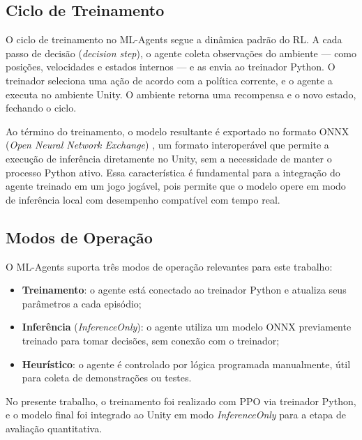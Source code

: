\subsection{Ciclo de Treinamento}
\label{subsec:ml-agents-ciclo}

O ciclo de treinamento no ML-Agents segue a dinâmica padrão do RL. A cada
passo de decisão (\textit{decision step}), o agente coleta observações do
ambiente --- como posições, velocidades e estados internos --- e as envia ao
treinador Python. O treinador seleciona uma ação de acordo com a política
corrente, e o agente a executa no ambiente Unity. O ambiente retorna uma
recompensa e o novo estado, fechando o ciclo.

Ao término do treinamento, o modelo resultante é exportado no formato ONNX
(\textit{Open Neural Network Exchange}) \cite{onnx2019}, um formato
interoperável que permite a execução de inferência diretamente no Unity, sem
a necessidade de manter o processo Python ativo. Essa característica é
fundamental para a integração do agente treinado em um jogo jogável, pois
permite que o modelo opere em modo de inferência local com desempenho
compatível com tempo real.

\subsection{Modos de Operação}
\label{subsec:ml-agents-modos}

O ML-Agents suporta três modos de operação relevantes para este trabalho:

\begin{itemize}
    \item \textbf{Treinamento}: o agente está conectado ao treinador Python e
          atualiza seus parâmetros a cada episódio;
    \item \textbf{Inferência} (\textit{InferenceOnly}): o agente utiliza um
          modelo ONNX previamente treinado para tomar decisões, sem conexão
          com o treinador;
    \item \textbf{Heurístico}: o agente é controlado por lógica programada
          manualmente, útil para coleta de demonstrações ou testes.
\end{itemize}

No presente trabalho, o treinamento foi realizado com PPO via treinador
Python, e o modelo final foi integrado ao Unity em modo
\textit{InferenceOnly} para a etapa de avaliação quantitativa.

